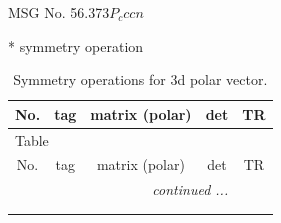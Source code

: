 \documentclass[fleqn,8pt]{jsarticle}
\begin{document}
\setcounter{MaxMatrixCols}{32}

\renewcommand{\tablename}{Table~}
\renewcommand{\figurename}{Figure~}
\begin{center}
\LARGE
MSG No. 56.373\quad$P_{c}ccn$
\end{center}
* symmetry operation
\renewcommand{\arraystretch}{1.3}
\begin{longtable}{ccccc}
\caption{Symmetry operations for 3d polar vector.}
 \\
 \hline \hline
No. & tag & matrix (polar) & det & TR \\ \hline \endfirsthead

\multicolumn{4}{l}{\tablename\ \thetable{}} \\
 \hline \hline
No. & tag & matrix (polar) & det & TR \\ \hline \endhead

 \hline \hline
\multicolumn{4}{r}{\footnotesize\it continued ...} \\ \endfoot

 \hline \hline
\multicolumn{4}{r}{} \\ \endlastfoot


\end{longtable}
\end{document}
